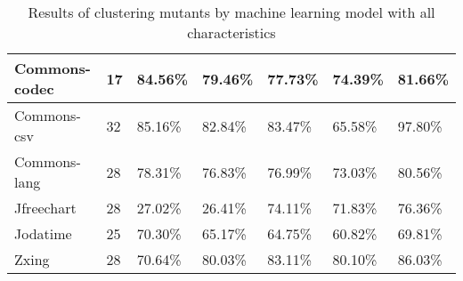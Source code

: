 \documentclass[../../main]{subfiles}
\begin{document}
\begin{table}[!htb]
\begin{tabular}{|l|l|l|l|l|l|l|}
Commons-codec         & 17                   & 84.56\%                           & 79.46\%                                                & 77.73\%                            & 74.39\%                                                                                                                                    & 81.66\%                                                                                                                                    \\ \hline
Commons-csv           & 32                   & 85.16\%                           & 82.84\%                                                & 83.47\%                            & 65.58\%                                                                                                                                    & 97.80\%                                                                                                                                    \\ \hline
Commons-lang          & 28                   & 78.31\%                           & 76.83\%                                                & 76.99\%                            & 73.03\%                                                                                                                                    & 80.56\%                                                                                                                                    \\ \hline
Jfreechart            & 28                   & 27.02\%                           & 26.41\%                                                & 74.11\%                            & 71.83\%                                                                                                                                    & 76.36\%                                                                                                                                    \\ \hline
Jodatime              & 25                   & 70.30\%                           & 65.17\%                                                & 64.75\%                            & 60.82\%                                                                                                                                    & 69.81\%                                                                                                                                    \\ \hline
Zxing                 & 28                   & 70.64\%                           & 80.03\%                                                & 83.11\%                            & 80.10\%                                                                                                                                    & 86.03\%                                                                                                                                    \\ \hline
\end{tabular}
\caption{\label{tab:ml_no_distance}Results of clustering mutants by machine learning model with all characteristics}
\end{table}
\end{document}

